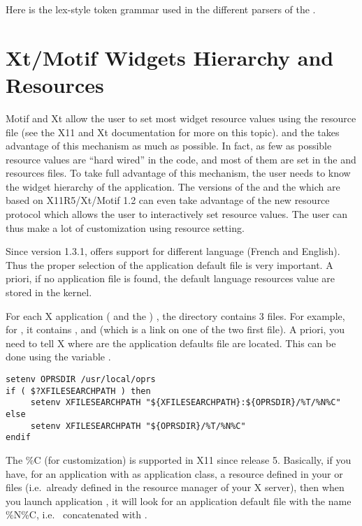 Here is the lex-style token grammar used in the different parsers of the
\COPRSDE{}.


\chapter{Xt/Motif Widgets Hierarchy and Resources}

Motif and Xt allow the user to set most widget resource values using the
resource file (see the X11 \cite{Xlib-manual} and Xt \cite{Xt-manual}
documentation for more on this topic).  \XOPRS{} and the \OPE{} takes advantage
of this mechanism as much as possible. In fact, as few as possible resource
values are ``hard wired'' in the code, and most of them are set in the
 and  resources files. To take full advantage
of this mechanism, the user needs to know the widget hierarchy of the
application. The versions of the \XOPRS{} and the \OPE{} which are based on
X11R5/Xt/Motif 1.2 can even take advantage of the new resource protocol which
allows the user to interactively set resource values. The user can thus make a
lot of customization using resource setting.

Since version 1.3.1, \COPRS{} offers support for different language (French and
English). Thus the proper selection of the application default file is very
important. A priori, if no application file is found, the default language
resources value are stored in the kernel. 

For each X application (\XOPRS{} and the \OPE{}) , the 
directory contains 3 files.  For example, for \XOPRS{}, it contains
,  and  (which is a link on one of the
two first file). A priori, you need to tell X where are the application
defaults file are located. This can be done using the variable
.

\begin{verbatim}
setenv OPRSDIR /usr/local/oprs
if ( $?XFILESEARCHPATH ) then
     setenv XFILESEARCHPATH "${XFILESEARCHPATH}:${OPRSDIR}/%T/%N%C"
else
     setenv XFILESEARCHPATH "${OPRSDIR}/%T/%N%C"
endif
\end{verbatim}

The \%C (for customization) is supported in X11 since release 5. Basically, if
you have, for an application  with  as
application class, a  resource
defined in your  or  files (i.e.\ already
defined in the resource manager of your X server), then when you launch
application , it will look for an application default file with
the name \%N\%C, i.e.\  concatenated with .

